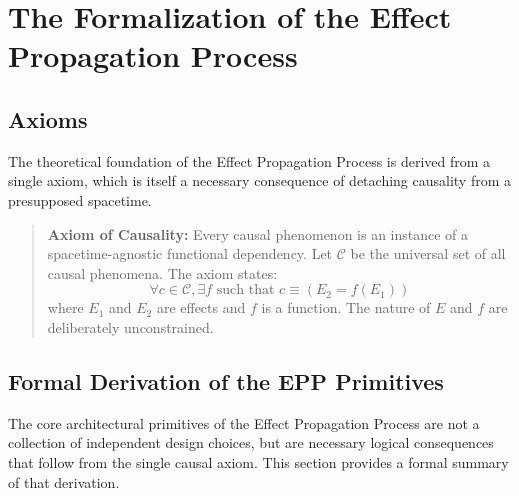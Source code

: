 


\section{The Formalization of the Effect Propagation Process}
\label{sec:formalization}


\subsection{Axioms}
\label{sec:formalization_axioms}

The theoretical foundation of the Effect Propagation Process is derived from a single axiom, which is itself a necessary consequence of detaching causality from a presupposed spacetime.

\begin{quotation}
\noindent\textbf{Axiom of Causality:} Every causal phenomenon is an instance of a spacetime-agnostic functional dependency. Let $\mathcal{C}$ be the universal set of all causal phenomena. The axiom states:
\begin{equation}
\forall c \in \mathcal{C}, \exists f \text{ such that } c \equiv (E_2 = f(E_1))
\end{equation}
where $E_1$ and $E_2$ are effects and $f$ is a function. The nature of $E$ and $f$ are deliberately unconstrained.
\end{quotation}

\subsection{Formal Derivation of the EPP Primitives}
\label{sec:formalization_derivation}

The core architectural primitives of the Effect Propagation Process are not a collection of independent design choices, but are necessary logical consequences that follow from the single causal axiom. This section provides a formal summary of that derivation.

